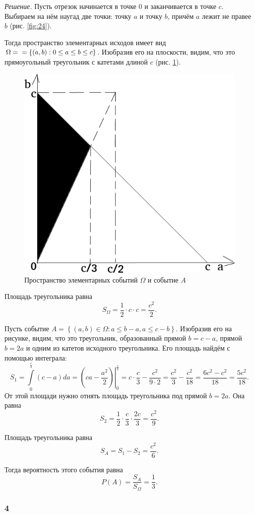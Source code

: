 \textit{Решение.} Пусть отрезок начинается в точке 0 и заканчивается в точке $c$.
Выбираем на нём наугад две точки: точку $a$ и точку $b$, причём $a$ лежит не правее $b$ (рис. \ref{fig:24}).

Тогда пространство элементарных исходов имеет вид $ \Omega =  \\
= \left\{ \left( a, b \right): 0 \leq a \leq b \leq c \right\} $.
Изобразив его на плоскости, видим, что это прямоугольный треугольник с катетами длиной $c$ (рис. \ref{fig:33}).

\begin{figure}[h!]
  \centering
  \includegraphics[width=.4\textwidth]{./pictures/t1v3_3.png}
  \caption{Пространство элементарных событий $ \Omega$ и событие $A$}
  \label{fig:33}
\end{figure}

Площадь треугольника равна
$$S_{ \Omega } =
\frac{1}{2} \cdot c \cdot c =
\frac{c^2}{2}.$$

Пусть событие $A = \left\{ \left( a, b \right) \in \Omega: a \leq b-a, a \leq c-b \right\} $.
Изобразив его на рисунке, видим, что это треугольник, образованный прямой $b = c - a$, прямой $b = 2a$ и одним из катетов исходного треугольника.
Его площадь найдём с помощью интеграла:
$$S_1 =
\int \limits_0^{ \frac{c}{3} } \left( c - a \right) da =
\left. \left( ca - \frac{a^2}{2} \right) \right|_0^{ \frac{c}{3} } =
c \cdot \frac{c}{3} - \frac{c^2}{9 \cdot 2} =
\frac{c^2}{3} - \frac{c^2}{18} =
\frac{6c^2 - c^2}{18} =
\frac{5c^2}{18}.$$
От этой площади нужно отнять площадь треугольника под прямой $b = 2a$.
Она равна
$$S_2 =
\frac{1}{2} \cdot \frac{c}{3} \cdot \frac{2c}{3} =
\frac{c^2}{9}.$$

Площадь треугольника равна
$$S_A =
S_1 - S_2 =
\frac{c^2}{6}.$$

Тогда вероятность этого события равна
$$P \left( A \right) =
\frac{S_A}{S_{ \Omega }} =
\frac{1}{3}.$$

\subsubsection*{4}

